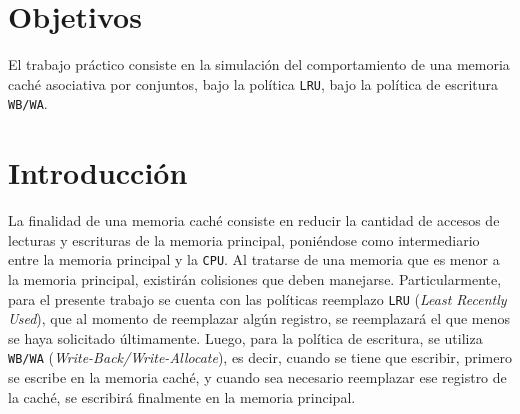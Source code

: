 \documentclass[titlepage,a4paper]{article}
\begin{document}
\tableofcontents %
\newpage


\section{Objetivos}\label{sec:objetivos}
El trabajo práctico consiste en la simulación del comportamiento de una memoria caché asociativa por conjuntos, bajo la política \verb|LRU|, bajo la política de escritura \verb|WB/WA|.

\section{Introducción}\label{sec:intro}
La finalidad de una memoria caché consiste en reducir la cantidad de accesos de lecturas y escrituras de la memoria principal, poniéndose como intermediario entre la memoria principal y la \verb|CPU|. Al tratarse de una memoria que es menor a la memoria principal, existirán colisiones que deben manejarse. Particularmente, para el presente trabajo se cuenta con las políticas reemplazo \verb|LRU| (\textit{Least Recently Used}), que al momento de reemplazar algún registro, se reemplazará el que menos se haya solicitado últimamente. Luego, para la política de escritura, se utiliza \verb|WB/WA| (\textit{Write-Back/Write-Allocate}), es decir, cuando se tiene que escribir, primero se escribe en la memoria caché, y cuando sea necesario reemplazar ese registro de la caché, se escribirá finalmente en la memoria principal.
\end{document}
